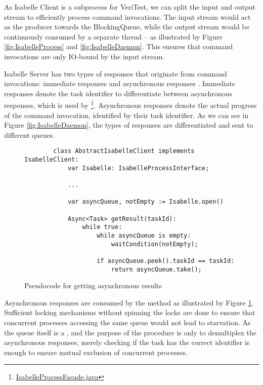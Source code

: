 As Isabelle Client is a subprocess for VeriTest, we can split the input and output stream to efficiently process command invocations. 
The input stream would act as the producer towards the BlockingQueue, while the output stream would be continuously consumed by a separate 
thread -- as illustrated by Figure \ref{fig:IsabelleProcess} and \ref{fig:IsabelleDaemon}. This ensures that command invocations are only 
IO-bound by the input stream.

Isabelle Server has two types of responses that originate from command invocations: immediate responses and asynchronous responses 
\cite[Sec 4.2.6]{isabelleSystem}. Immediate responses denote the task identifier to differentiate between asynchronous responses, 
which is used by 
\footnote{\href{https://github.com/achmadafriza/veritest-dev/blob/master/src/main/java/com/veriopt/veritest/isabelle/IsabelleProcessFacade.java}{IsabelleProcessFacade.java}}. 
Asynchronous responses denote the actual progress of the command invocation, 
identified by their task identifier. As we can see in Figure \ref{fig:IsabelleDaemon}, the types of responses are differentiated and sent 
to different queues.

\begin{figure}[!htb]
    \begin{lstlisting}
        class AbstractIsabelleClient implements IsabelleClient:
            var Isabelle: IsabelleProcessInterface;
            
            ...

            var asyncQueue, notEmpty := Isabelle.open()

            Async<Task> getResult(taskId):
                while true:
                    while asyncQueue is empty:
                        waitCondition(notEmpty);
                
                    if asyncQueue.peek().taskId == taskId:
                        return asyncQueue.take();
    \end{lstlisting}

    \caption{Pseudocode for getting asynchronous results}
    \label{fig:getResult}
\end{figure}

Asynchronous responses are consumed by the  method as illustrated by Figure \ref{fig:getResult}. Sufficient locking 
mechanisms without spinning the locks are done to ensure that concurrent processes accessing the same queue would not lead to starvation.
As the queue itself is a , and the purpose of the procedure is only to demultiplex the asynchronous responses, merely 
checking if the task has the correct identifier is enough to ensure mutual exclusion of concurrent processes.

